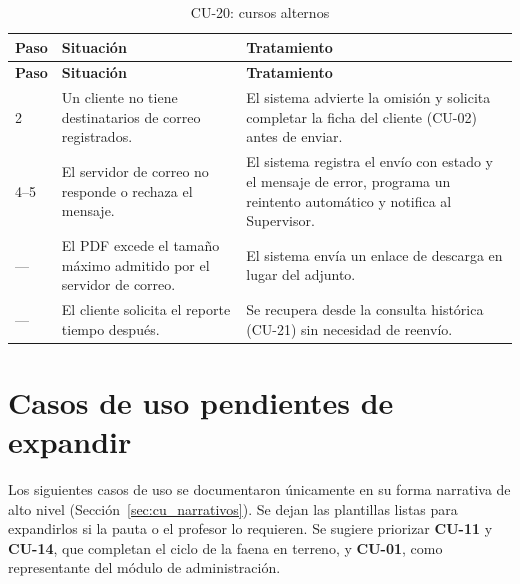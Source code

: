 {\estilotabla
\begin{longtable}{C{0.06\textwidth} L{0.38\textwidth} L{0.48\textwidth}}

\caption{CU-20: cursos alternos}
\label{tab:cu20_alt}
\\

\toprule
\textbf{Paso} & \textbf{Situación} & \textbf{Tratamiento} \\
\midrule
\endfirsthead

\toprule
\textbf{Paso} & \textbf{Situación} & \textbf{Tratamiento} \\
\midrule
\endhead

2 & Un cliente no tiene destinatarios de correo registrados. &
El sistema advierte la omisión y solicita completar la ficha del cliente (CU-02) antes de
enviar. \\
\midrule

4--5 & El servidor de correo no responde o rechaza el mensaje. &
El sistema registra el envío con estado  y el mensaje de error, programa un
reintento automático y notifica al Supervisor. \\
\midrule

--- & El PDF excede el tamaño máximo admitido por el servidor de correo. &
El sistema envía un enlace de descarga en lugar del adjunto.  \\
\midrule

--- & El cliente solicita el reporte tiempo después. &
Se recupera desde la consulta histórica (CU-21) sin necesidad de reenvío. \\

\bottomrule

\end{longtable}
}

\section{Casos de uso pendientes de expandir}
\label{sec:cu_pendientes}

\begin{pendiente}
Los siguientes casos de uso se documentaron únicamente en su forma narrativa de alto nivel
(Sección~\ref{sec:cu_narrativos}). Se dejan las plantillas listas para expandirlos si la pauta o el
profesor lo requieren. Se sugiere priorizar \textbf{CU-11} y \textbf{CU-14}, que completan el ciclo
de la faena en terreno, y \textbf{CU-01}, como representante del módulo de administración.
\end{pendiente}

